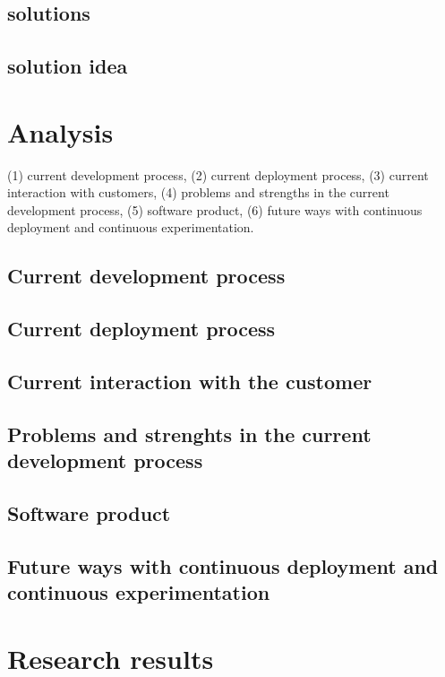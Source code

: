 \documentclass[english]{tktltiki2}
\theoremstyle{definition}
\theoremstyle{remark}
\begin{document}
\subsection{solutions}

\subsection{solution idea}




\section{Analysis}

 (1) current development process, (2) current deployment process, (3) current interaction with customers, (4) problems and strengths in the current development process, (5) software product, (6) future ways with continuous deployment and continuous experimentation.


\subsection{Current development process}

\subsection{Current deployment process}

\subsection{Current interaction with the customer}

\subsection{Problems and strenghts in the current development process}

\subsection{Software product}

\subsection{Future ways with continuous deployment and continuous experimentation}

\section{Research results}
\end{document}
